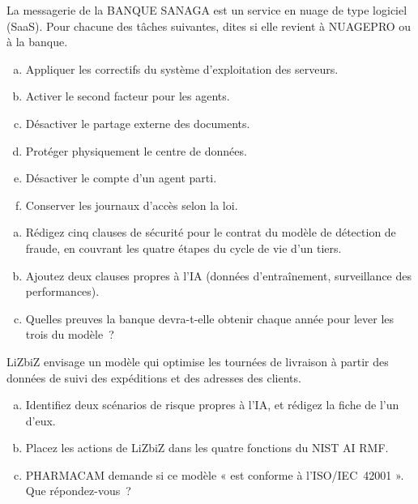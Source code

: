 \begin{boxexo}[title={\ding{45}\quad Exercice~15.1. Qui en répond~? \niveaubase}]
La messagerie de la BANQUE SANAGA est un service en nuage de type logiciel
(SaaS). Pour chacune des tâches suivantes, dites si elle revient à NUAGEPRO
ou à la banque.
\begin{enumerate}[(a)]
    \item Appliquer les correctifs du système d'exploitation des serveurs.
    \item Activer le second facteur pour les agents.
    \item Désactiver le partage externe des documents.
    \item Protéger physiquement le centre de données.
    \item Désactiver le compte d'un agent parti.
    \item Conserver les journaux d'accès selon la loi.
\end{enumerate}
\end{boxexo}

\begin{boxexo}[title={\ding{45}\quad Exercice~15.2. Le contrat de FRAUDSCAN \niveaumoyen}]
\begin{enumerate}[(a)]
    \item Rédigez cinq clauses de sécurité pour le contrat du modèle de
          détection de fraude, en couvrant les quatre étapes du cycle de vie
          d'un tiers.
    \item Ajoutez deux clauses propres à l'IA (données d'entraînement,
          surveillance des performances).
    \item Quelles preuves la banque devra-t-elle obtenir chaque année pour
          lever les trois \NEK{} du modèle~?
\end{enumerate}
\end{boxexo}

\begin{boxexo}[title={\ding{45}\quad Exercice~15.3. L'IA chez LiZbiZ \niveaumoyen}]
LiZbiZ envisage un modèle qui optimise les tournées de livraison à partir
des données de suivi des expéditions et des adresses des clients.
\begin{enumerate}[(a)]
    \item Identifiez deux scénarios de risque propres à l'IA, et rédigez la
          fiche de l'un d'eux.
    \item Placez les actions de LiZbiZ dans les quatre fonctions du NIST AI
          RMF.
    \item PHARMACAM demande si ce modèle « est conforme à
          l'ISO/IEC~42001 ». Que répondez-vous~?
\end{enumerate}
\end{boxexo}

